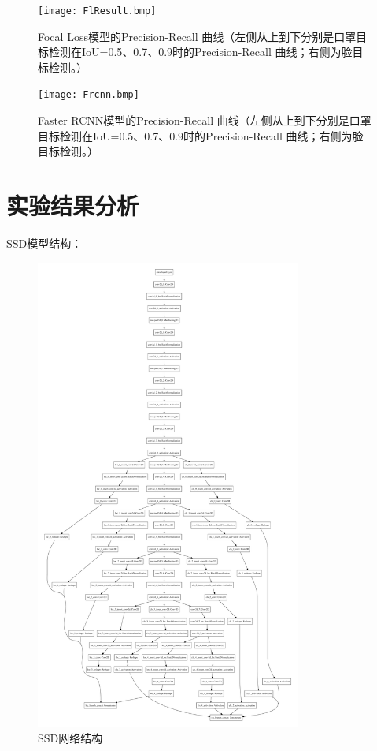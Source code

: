 \documentclass[journal,transmag]{IEEEtran}
\begin{document}
\begin{figure}[h]
\centering
\texttt{[image: FlResult.bmp]}
\caption{Focal Loss模型的Precision-Recall 曲线（左侧从上到下分别是口罩目标检测在IoU=0.5、0.7、0.9时的Precision-Recall 曲线；右侧为脸目标检测。）}
\end{figure}

\begin{figure}[h]
\centering
\texttt{[image: Frcnn.bmp]}
\caption{Faster RCNN模型的Precision-Recall 曲线（左侧从上到下分别是口罩目标检测在IoU=0.5、0.7、0.9时的Precision-Recall 曲线；右侧为脸目标检测。）}
\end{figure}

\section{实验结果分析}
SSD模型结构：
\begin{figure}[h]
\centering
\includegraphics[width=3.44in]{modelgraph.pdf}
\caption{SSD网络结构}
\end{figure}
\end{document}
